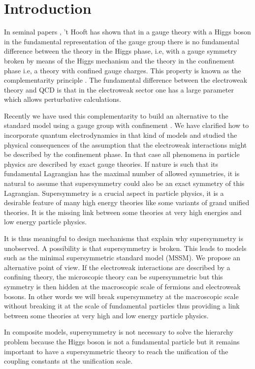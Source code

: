 \documentclass[a4paper,12pt]{article}
\begin{document}
\section{Introduction}
In seminal papers \cite{tHooft1,tHooft2}, 't Hooft has shown that in a
gauge theory with a Higgs boson in the fundamental representation of
the gauge group there is no fundamental difference between the theory
in the Higgs phase, i.e, with a gauge symmetry broken by means of the
Higgs mechanism and the theory in the confinement phase i.e, a theory
with confined gauge charges. This property is known as the
complementarity principle \cite{Osterwalder:1978pc}. The fundamental
difference between the electroweak theory and QCD is that in the
electroweak sector one has a large parameter which allows perturbative
calculations.

Recently we have used this complementarity to build an alternative to
the standard model using a \coordHE{} gauge group with
\coordHE{} confinement \cite{CF}.  We have clarified how to incorporate
quantum electrodynamics in that kind of models and studied the
physical consequences of the assumption that the electroweak
interactions might be described by the confinement phase.  In that
case all phenomena in particle physics are described by exact gauge
theories. If nature is such that its fundamental Lagrangian has the
maximal number of allowed symmetries, it is natural to assume that
supersymmetry could also be an exact symmetry of this Lagrangian.
Supersymmetry is a crucial aspect in particle physics, it is a
desirable feature of many high energy theories like some variants of
grand unified theories. It is the missing link between some theories
at very high energies and low energy particle physics.


It is thus meaningful to design mechanisms that explain why
supersymmetry is unobserved. A possibility is that supersymmetry is
broken. This leads to models such as the minimal supersymmetric
standard model (MSSM). We propose an alternative point of view. If the
electroweak interactions are described by a confining theory, the
microscopic theory can be supersymmetric but this symmetry is then
hidden at the macroscopic scale of fermions and electroweak bosons.
In other words we will break supersymmetry at the macroscopic scale
without breaking it at the scale of fundamental particles thus
providing a link between some theories at very high and low energy
particle physics.

In composite models, supersymmetry is not necessary to solve the
hierarchy problem because the Higgs boson is not a fundamental
particle but it remains important to have a supersymmetric theory to
reach the unification of the coupling constants at the unification
scale.
\end{document}
